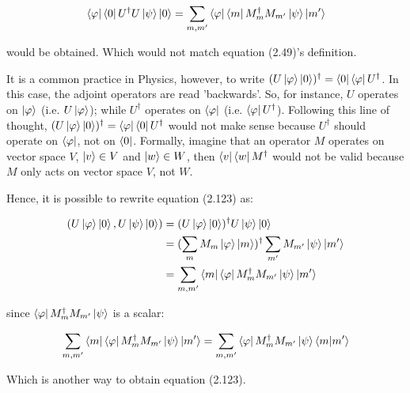 \[
\bra{\varphi} \bra{0} U^\dagger U \ket{\psi} \ket{0} =
\sum_{m,m'} \bra{\varphi}\bra{m} M^\dagger_m M_{m'} \ket{\psi} \ket{m'}
\]

would be obtained. Which would not match equation (2.49)'s definition.

It is a common practice in Physics, however, to write $(U\ket{\varphi} \ket{0})^\dagger = \bra{0} \bra{\varphi} U^\dagger$. In this case, the adjoint operators are read 'backwards'. So, for instance, $U$ operates on $\ket{\varphi}$ (i.e. $U\ket{\varphi}$); while $U^\dagger$ operates on $\bra{\varphi}$ (i.e. $\bra{\varphi} U^\dagger$). Following this line of thought, $(U\ket{\varphi} \ket{0})^\dagger = \bra{\varphi} \bra{0} U^\dagger$ would not make sense because $U^\dagger$ should operate on $\bra{\varphi}$, not on $\bra{0}$. Formally, imagine that an operator $M$ operates on vector space $V$, $\ket{v} \in V$ and $\ket{w} \in W$, then $\bra{v} \bra{w} M^\dagger$ would not be valid because $M$ only acts on vector space $V$, not $W$.

Hence, it is possible to rewrite equation (2.123) as:

\begin{align}
    (U \ket{\varphi} \ket{0}, U \ket{\psi} \ket{0}) &= 
    (U \ket{\varphi} \ket{0})^\dagger U \ket{\psi} \ket{0}
    \\ 
    &= (\sum_m M_m \ket{\varphi} \ket{m})^\dagger \sum_{m'} M_{m'} \ket{\psi} \ket{m'}
    \\
    &= \sum_{m, m'} \bra{m} \bra{\varphi} M_m^\dagger M_{m'} \ket{\psi} \ket{m'}
\end{align}

since $\bra{\varphi} M_m^\dagger M_{m'} \ket{\psi}$ is a scalar:

\begin{align}
    \sum_{m, m'} \bra{m} \bra{\varphi} M_m^\dagger M_{m'} \ket{\psi} \ket{m'} =
    \sum_{m, m'} \bra{\varphi} M_m^\dagger M_{m'} \ket{\psi} \braket{m | m'}
\end{align}

Which is another way to obtain equation (2.123).